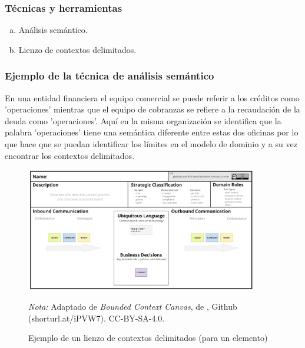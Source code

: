\subsubsection*{Técnicas y herramientas}
\begin{enumerate}[a.]
	\item Análisis semántico.
  \item Lienzo de contextos delimitados.
\end{enumerate}

\subsubsection*{Ejemplo de la técnica de análisis semántico}

En una entidad financiera el equipo comercial se puede referir a los créditos 
como 'operaciones' mientras que el equipo de cobranzas se refiere a la recaudación de la deuda como 'operaciones'.
Aquí en la misma organización se identifica que la palabra 'operaciones' tiene una semántica diferente entre
estas dos oficinas por lo que hace que se puedan identificar los límites en el modelo de dominio y a su vez 
encontrar los contextos delimitados.


\vspace{1em}

  \begin{figure}[H]
    \caption{Ejemplo de un lienzo de contextos delimitados (para un elemento)}
    \begin{center}
    \includegraphics[width=0.90\textwidth]{src/assets/metodologia/bounded_context_canvas}
    \label{fig:bounded_context_canvas}
    \end{center}
    \textit{Nota:} Adaptado de \textit{Bounded Context Canvas}, de \cite{canvas}, Github (shorturl.at/iPVW7). CC-BY-SA-4.0.
  \end{figure}


